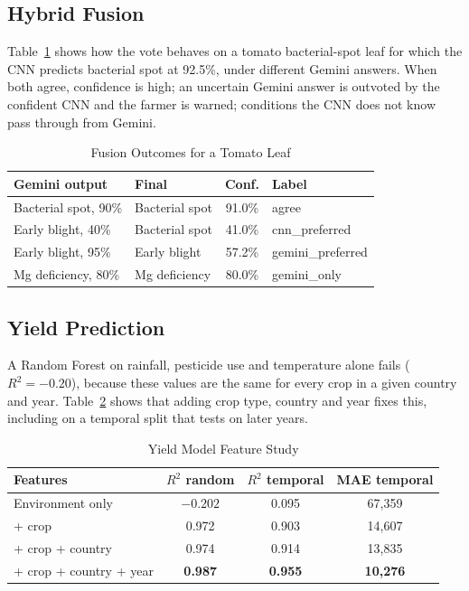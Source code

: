 \documentclass[conference]{IEEEtran}
\begin{document}
\subsection{Hybrid Fusion}
Table~\ref{tab:fusion} shows how the vote behaves on a tomato bacterial-spot leaf for which the CNN predicts bacterial spot at 92.5\%, under different Gemini answers. When both agree, confidence is high; an uncertain Gemini answer is outvoted by the confident CNN and the farmer is warned; conditions the CNN does not know pass through from Gemini.

\begin{table}[t]
\caption{Fusion Outcomes for a Tomato Leaf}
\label{tab:fusion}
\centering
\footnotesize
\begin{tabular}{@{}llcl@{}}
\toprule
\textbf{Gemini output} & \textbf{Final} & \textbf{Conf.} & \textbf{Label} \\
\midrule
Bacterial spot, 90\% & Bacterial spot & 91.0\% & agree \\
Early blight, 40\% & Bacterial spot & 41.0\% & cnn\_preferred \\
Early blight, 95\% & Early blight & 57.2\% & gemini\_preferred \\
Mg deficiency, 80\% & Mg deficiency & 80.0\% & gemini\_only \\
\bottomrule
\end{tabular}
\end{table}

\subsection{Yield Prediction}
A Random Forest on rainfall, pesticide use and temperature alone fails ($R^2 = -0.20$), because these values are the same for every crop in a given country and year. Table~\ref{tab:yield} shows that adding crop type, country and year fixes this, including on a temporal split that tests on later years.

\begin{table}[t]
\caption{Yield Model Feature Study}
\label{tab:yield}
\centering
\footnotesize
\setlength{\tabcolsep}{4pt}
\begin{tabular}{@{}lccc@{}}
\toprule
\textbf{Features} & \textbf{$R^2$ random} & \textbf{$R^2$ temporal} & \textbf{MAE temporal} \\
\midrule
Environment only & $-0.202$ & 0.095 & 67,359 \\
+ crop & 0.972 & 0.903 & 14,607 \\
+ crop + country & 0.974 & 0.914 & 13,835 \\
+ crop + country + year & \textbf{0.987} & \textbf{0.955} & \textbf{10,276} \\
\bottomrule
\end{tabular}
\end{table}
\end{document}
